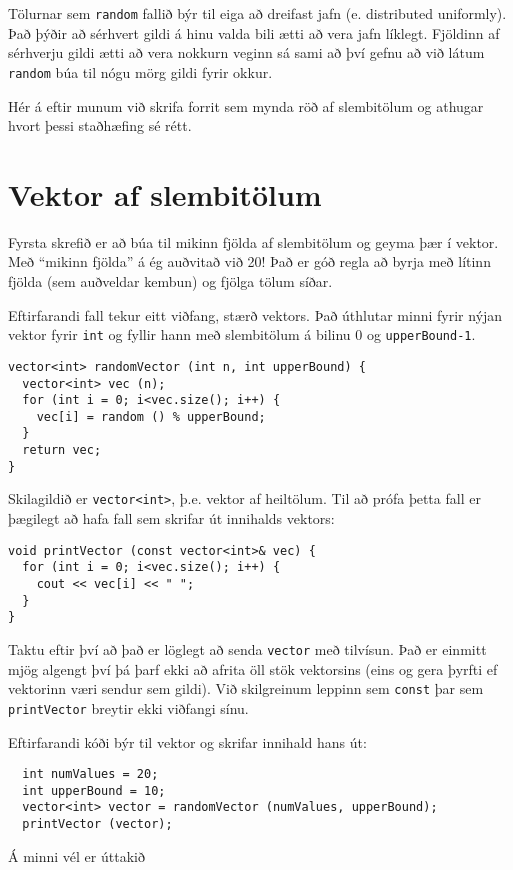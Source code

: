 Tölurnar sem {\tt random} fallið býr til eiga að dreifast jafn (e. distributed uniformly).
Það þýðir að sérhvert gildi á hinu valda bili ætti að vera jafn líklegt.
Fjöldinn af sérhverju gildi ætti að vera nokkurn veginn sá sami að því gefnu að við látum {\tt random} búa til nógu mörg gildi fyrir okkur.

Hér á eftir munum við skrifa forrit sem mynda röð af slembitölum og athugar hvort þessi staðhæfing sé rétt.

\section{Vektor af slembitölum}

Fyrsta skrefið er að búa til mikinn fjölda af slembitölum og geyma þær í vektor.
Með ``mikinn fjölda'' á ég auðvitað við 20!  
Það er góð regla að byrja með lítinn fjölda (sem auðveldar kembun) og fjölga tölum síðar.

Eftirfarandi fall tekur eitt viðfang, stærð vektors.
Það úthlutar minni fyrir nýjan vektor fyrir {\tt int} og fyllir hann með slembitölum á bilinu 0 og {\tt upperBound-1}.

\begin{verbatim}
vector<int> randomVector (int n, int upperBound) {
  vector<int> vec (n);
  for (int i = 0; i<vec.size(); i++) {
    vec[i] = random () % upperBound;
  }
  return vec;
}
\end{verbatim}
%
Skilagildið er {\tt vector<int>}, þ.e. vektor af heiltölum.
Til að prófa þetta fall er þægilegt að hafa fall sem skrifar út innihalds vektors:

\begin{verbatim}
void printVector (const vector<int>& vec) {
  for (int i = 0; i<vec.size(); i++) {
    cout << vec[i] << " ";
  }
}
\end{verbatim}
%
Taktu eftir því að það er löglegt að senda {\tt vector} með tilvísun.
Það er einmitt mjög algengt því þá þarf ekki að afrita öll stök vektorsins (eins og gera þyrfti ef vektorinn væri sendur sem gildi).
Við skilgreinum leppinn sem {\tt const} þar sem {\tt printVector} breytir ekki viðfangi sínu. 

Eftirfarandi kóði býr til vektor og skrifar innihald hans út: 

\begin{verbatim}
  int numValues = 20;
  int upperBound = 10;
  vector<int> vector = randomVector (numValues, upperBound);
  printVector (vector);
\end{verbatim}
%
Á minni vél er úttakið 

